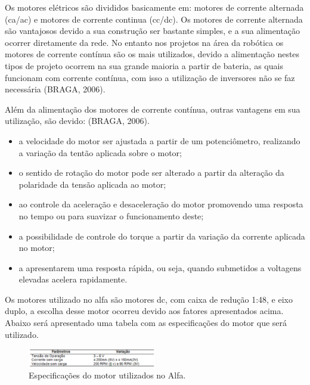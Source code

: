 Os motores elétricos são divididos basicamente em: motores de corrente alternada (ca/ac) e motores de corrente continua (cc/dc). Os motores de corrente alternada são vantajosos devido a sua construção ser bastante simples, e a sua alimentação ocorrer diretamente da rede. No entanto nos projetos na área da robótica os motores de corrente contínua são os mais utilizados, devido a alimentação nestes tipos de projeto ocorrem na sua grande maioria a partir de bateria, as quais funcionam com corrente contínua, com isso a utilização de inversores não se faz necessária (BRAGA, 2006).


Além da alimentação dos motores de corrente contínua, outras vantagens em sua utilização, são devido: (BRAGA, 2006).
\begin{itemize}
	\item a velocidade do motor ser ajustada a partir de um potenciômetro, realizando a variação da tentão aplicada sobre o motor;
	\item o sentido de rotação do motor pode ser alterado a partir da alteração da polaridade da tensão aplicada ao motor;
	\item ao controle da aceleração e desaceleração do motor promovendo uma resposta no tempo ou para suavizar o funcionamento deste;
	\item a possibilidade de controle do torque a partir da variação da corrente aplicada no motor;
	\item a apresentarem uma resposta rápida, ou seja, quando submetidos a voltagens elevadas acelera rapidamente.
\end{itemize}

Os motores utilizado no alfa são motores dc, com caixa de redução 1:48, e eixo duplo, a escolha desse motor ocorreu devido aos fatores apresentados acima. Abaixo será apresentado uma tabela com as especificações do motor que será utilizado.

\begin{figure}[H]
    \centering
    \includegraphics[width=0.5\textwidth]{figuras/tensao.eps}
    \caption{Especificações do motor utilizados no Alfa.}
    \label{fig:catia01}
\end{figure}

